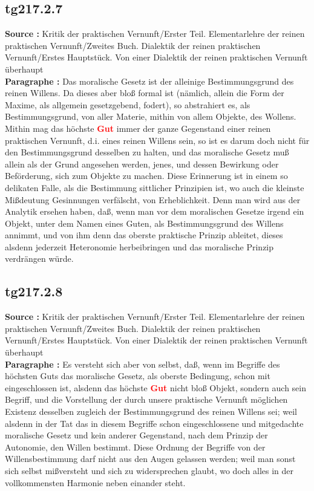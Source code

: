 \documentclass[a4paper,12pt,twoside]{book}
\newcommand{\match}[1]{\textcolor{red}{\textbf{#1}}}
\begin{document}
	\subsection*{tg217.2.7} 
	\textbf{Source : }Kritik der praktischen Vernunft/Erster Teil. Elementarlehre der reinen praktischen Vernunft/Zweites Buch. Dialektik der reinen praktischen Vernunft/Erstes Hauptstück. Von einer Dialektik der reinen praktischen Vernunft überhaupt\\  
	
	\noindent\textbf{Paragraphe : }Das moralische Gesetz ist der alleinige Bestimmungsgrund des reinen Willens. Da dieses aber bloß formal ist (nämlich, allein die Form der Maxime, als allgemein gesetzgebend, fodert), so abstrahiert es, als Bestimmungsgrund, von aller Materie, mithin von allem Objekte, des Wollens. Mithin mag das höchste \match{Gut} immer der ganze Gegenstand einer reinen praktischen Vernunft, d.i. eines reinen Willens sein, so ist es darum doch nicht für den Bestimmungsgrund desselben zu halten, und das moralische Gesetz muß allein als der Grund angesehen werden, jenes, und dessen Bewirkung oder Beförderung, sich zum Objekte zu machen. Diese Erinnerung ist in einem so delikaten Falle, als die Bestimmung sittlicher Prinzipien ist, wo auch die kleinste Mißdeutung Gesinnungen verfälscht, von Erheblichkeit. Denn man wird aus der Analytik ersehen haben, daß, wenn man vor dem moralischen Gesetze irgend ein Objekt, unter dem Namen eines Guten, als Bestimmungsgrund des Willens annimmt, und von ihm denn das oberste praktische Prinzip ableitet, dieses alsdenn jederzeit Heteronomie herbeibringen und das moralische Prinzip verdrängen würde. 
	
	\subsection*{tg217.2.8} 
	\textbf{Source : }Kritik der praktischen Vernunft/Erster Teil. Elementarlehre der reinen praktischen Vernunft/Zweites Buch. Dialektik der reinen praktischen Vernunft/Erstes Hauptstück. Von einer Dialektik der reinen praktischen Vernunft überhaupt\\  
	
	\noindent\textbf{Paragraphe : }Es versteht sich aber von selbst, daß, wenn im Begriffe des höchsten Guts das moralische Gesetz, als oberste Bedingung, schon mit eingeschlossen ist, alsdenn das höchste \match{Gut} nicht bloß Objekt, sondern auch sein Begriff, und die Vorstellung der durch unsere praktische Vernunft möglichen Existenz desselben zugleich der Bestimmungsgrund des reinen Willens sei; weil alsdenn in der Tat das in diesem Begriffe schon eingeschlossene und mitgedachte moralische Gesetz und kein anderer Gegenstand, nach dem Prinzip der Autonomie, den Willen bestimmt. Diese Ordnung der Begriffe von der Willensbestimmung darf nicht aus den Augen gelassen werden; weil man sonst sich selbst mißversteht und sich zu widersprechen glaubt, wo doch alles in der vollkommensten Harmonie neben einander steht. 
	
\end{document}
